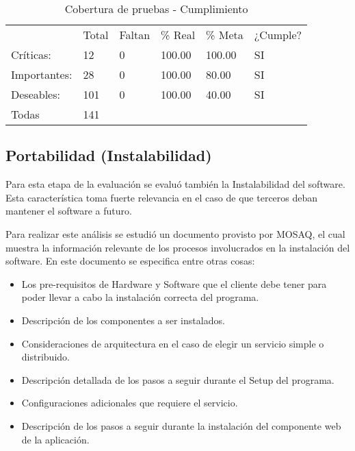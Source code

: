 \begin{table}
  \small
\centering
    \begin{tabular}{llllll}
    ~               &  		Total &  		Faltan &  		\% Real &  		\% Meta & ¿Cumple? \\
     		Críticas:    &  		12    & 0         &  		100.00 &  		100.00 &  		SI    \\
     		Importantes: &  		28    & 0         &  		100.00 &  		80.00  &  		SI    \\
     		Deseables:   &  		101   & 0         &  		100.00 &  		40.00  &  		SI    \\
     		Todas        &  		141   & ~         & ~         & ~         & ~        \\ \hline
    \end{tabular}
         \caption{Cobertura de pruebas - Cumplimiento}
    \label{table:CBC}
\end{table}

\subsection{Portabilidad (Instalabilidad)}
\label{ins}
Para esta etapa de la evaluación se evaluó también la Instalabilidad del software.
Esta característica toma fuerte relevancia en el caso de que terceros deban mantener el software a futuro.

Para realizar este análisis se estudió un documento provisto por MOSAQ, el cual
muestra la información relevante de los procesos involucrados en la instalación del software.
En este documento se especifica entre otras cosas:

\begin{itemize}
\item Los pre-requisitos de Hardware y Software que el cliente debe tener para poder llevar a cabo la instalación correcta del programa.
\item Descripción de los componentes a ser instalados.
\item Consideraciones de arquitectura en el caso de elegir un servicio simple o distribuido.
\item Descripción detallada de los pasos a seguir durante el Setup del programa.
\item Configuraciones adicionales que requiere el servicio.
\item Descripción de los pasos a seguir durante la instalación del componente web de la aplicación.
\end{itemize}

